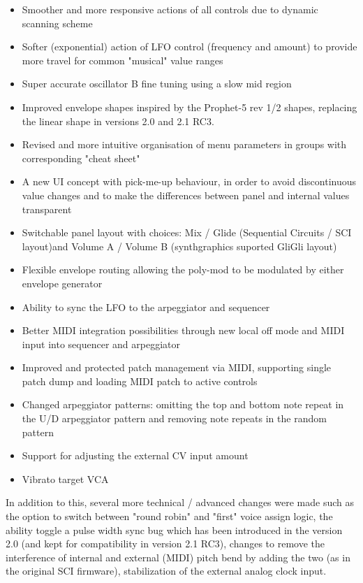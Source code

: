 \documentclass[landscape, 11pt, oneside, twoside]{report}
\newenvironment{flowtext}{\addmargin[0cm]{0cm}}{\endaddmargin} %
\begin{document}
\begin{flowtext}
\begin{itemize}
  \setlength\itemsep{0cm}
  \item Smoother and more responsive actions of all controls due to dynamic scanning scheme 
  \item Softer (exponential) action of LFO control (frequency and amount) to provide more travel for common "musical" value ranges
  \item Super accurate oscillator B fine tuning using a slow mid region
  \item Improved envelope shapes inspired by the Prophet-5 rev 1/2 shapes, replacing the linear shape in versions 2.0 and 2.1 RC3.  
  \item Revised and more intuitive organisation of menu parameters in groups with corresponding "cheat sheet"
  \item A new UI concept with pick-me-up behaviour, in order to avoid discontinuous value changes and to make the differences between panel and internal values transparent 
  \item Switchable panel layout with choices: Mix / Glide (Sequential Circuits / SCI layout)and Volume A / Volume B (synthgraphics suported GliGli layout) 
  \item Flexible envelope routing allowing the poly-mod to be modulated by either envelope generator
  \item Ability to sync the LFO to the arpeggiator and sequencer
  \item Better MIDI integration possibilities through new local off mode and MIDI input into sequencer and arpeggiator
  \item Improved and protected patch management via MIDI, supporting single patch dump and loading MIDI patch to active controls 
  \item Changed arpeggiator patterns: omitting the top and bottom note repeat in the U/D arpeggiator pattern and removing note repeats in the random pattern
  \item Support for adjusting the external CV input amount
  \item Vibrato target VCA
\end{itemize}

In addition to this, several more technical / advanced changes were made such as the option to switch between "round robin" and "first" voice assign logic, the ability toggle a pulse width sync bug which has been introduced in the version 2.0 (and kept for compatibility in version 2.1 RC3), changes to remove the interference  of internal and external (MIDI) pitch bend by adding the two (as in the original SCI firmware), stabilization of the external analog clock input.


\end{flowtext}
\end{document}
